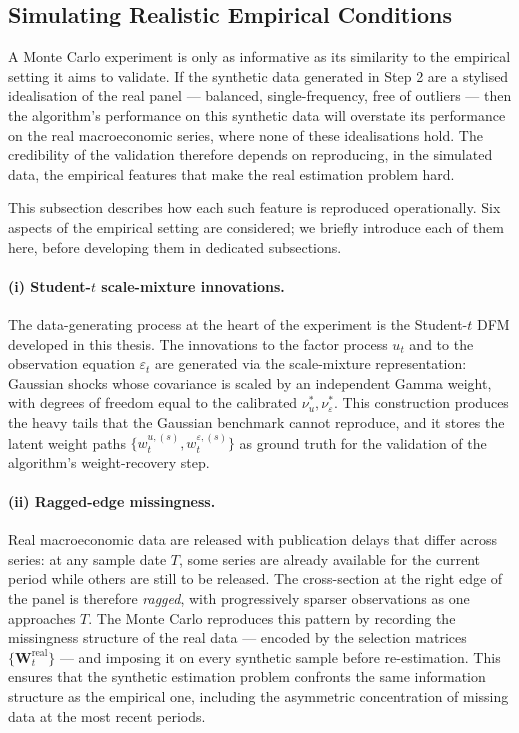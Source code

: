 \documentclass[11pt, a4paper, oneside]{article}
\begin{document}
\subsection{Simulating Realistic Empirical Conditions}
\label{subsec:mc-simulation}

A Monte Carlo experiment is only as informative as its similarity to
the empirical setting it aims to validate. If the synthetic data
generated in Step 2 are a stylised idealisation of the real panel —
balanced, single-frequency, free of outliers — then the algorithm's
performance on this synthetic data will overstate its performance on
the real macroeconomic series, where none of these idealisations
hold. The credibility of the validation therefore depends on
reproducing, in the simulated data, the empirical features that make
the real estimation problem hard.

This subsection describes how each such feature is reproduced
operationally. Six aspects of the empirical setting are considered;
we briefly introduce each of them here, before developing them in
dedicated subsections.

\paragraph{(i) Student-$t$ scale-mixture innovations.}
The data-generating process at the heart of the experiment is the
Student-$t$ DFM developed in this thesis. The innovations to the
factor process $u_t$ and to the observation equation
$\varepsilon_t$ are generated via the scale-mixture representation:
Gaussian shocks whose covariance is scaled by an independent Gamma
weight, with degrees of freedom equal to the calibrated
$\nu_u^*, \nu_\varepsilon^*$. This construction produces the heavy
tails that the Gaussian benchmark cannot reproduce, and it stores
the latent weight paths $\{w_t^{u,(s)}, w_t^{\varepsilon, (s)}\}$
as ground truth for the validation of the algorithm's
weight-recovery step.

\paragraph{(ii) Ragged-edge missingness.}
Real macroeconomic data are released with publication delays that
differ across series: at any sample date $T$, some series are
already available for the current period while others are still to
be released. The cross-section at the right edge of the panel is
therefore \emph{ragged}, with progressively sparser observations
as one approaches $T$. The Monte Carlo reproduces this pattern by
recording the missingness structure of the real data — encoded by
the selection matrices $\{\mathbf{W}_t^{\mathrm{real}}\}$ — and
imposing it on every synthetic sample before re-estimation. This
ensures that the synthetic estimation problem confronts the same
information structure as the empirical one, including the
asymmetric concentration of missing data at the most recent
periods.
\end{document}
